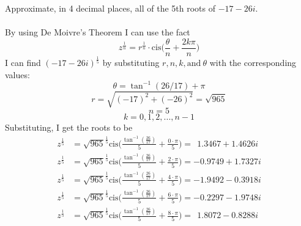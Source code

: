 \documentclass[titlepage]{article}
\newenvironment{problem}[2][Problem]{\begin{trivlist}
\item[\hskip \labelsep {\bfseries #1}\hskip \labelsep {\bfseries #2.}]}{\end{trivlist}}
\begin{document}
\begin{problem}{3}
Approximate, in 4 decimal places, all of the 5th roots of $-17-26i$.
\\ \\
By using De Moivre's Theorem I can use the fact
$$ z^{\frac{1}{n}} = r^{\frac{1}{n}} \cdot \text{cis}\bigg(\frac{\theta}{n} + \frac{2k\pi}{n}\bigg)$$
I can find $(-17-26i)^{\frac{1}{5}}$ by substituting $r, n, k, \text{and} \ \theta$ with the corresponding values:
$$ \theta = \tan^{-1}(26/17) + \pi$$
$$r =\sqrt{(-17)^2 + (-26)^2} = \sqrt{965}$$
$$n = 5$$
$$ k = 0, 1, 2, ..., n-1 $$
Substituting, I get the roots to be
\begin{align*}
z^{\frac{1}{5}} &= \sqrt{965}^{\frac{1}{5}} \text{cis}\bigg(\frac{\tan^{-1}(\frac{26}{17})}{5} + \frac{0\cdot\pi}{5} \bigg) = \ \ 1.3467 + 1.4626i\\
z^{\frac{1}{5}} &= \sqrt{965}^{\frac{1}{5}} \text{cis}\bigg(\frac{\tan^{-1}(\frac{26}{17})}{5} + \frac{2\cdot\pi}{5}\bigg) =-0.9749 + 1.7327i\\
z^{\frac{1}{5}} &= \sqrt{965}^{\frac{1}{5}} \text{cis}\bigg(\frac{\tan^{-1}(\frac{26}{17})}{5} + \frac{4\cdot\pi}{5}\bigg) =-1.9492 - 0.3918i\\
z^{\frac{1}{5}} &= \sqrt{965}^{\frac{1}{5}} \text{cis}\bigg(\frac{\tan^{-1}(\frac{26}{17})}{5} + \frac{6\cdot\pi}{5}\bigg) =-0.2297 - 1.9748i\\
z^{\frac{1}{5}} &= \sqrt{965}^{\frac{1}{5}} \text{cis}\bigg(\frac{\tan^{-1}(\frac{26}{17})}{5} + \frac{8\cdot\pi}{5}\bigg) = \ \ 1.8072 - 0.8288i\\
\end{align*} 
\end{problem}
\end{document}
